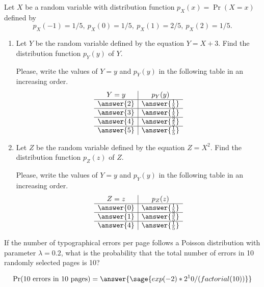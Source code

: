 \documentclass{ximera}
\begin{document}
\begin{problem}
Let $X$ be a random variable with distribution function $p_X(x)=\Pr(X=x)$ defined by
$$p_X(−1) = 1/5,~ p_X(0) = 1/5,~ p_X(1) = 2/5,~ p_X(2) = 1/5.$$

\medskip

\begin{enumerate}
    \item Let $Y$ be the random variable defined by the equation $Y = X + 3$. Find
the distribution function $p_Y (y)$ of $Y$.

\medskip

\begin{prompt}
    Please, write the values of $Y=y$ and $p_Y(y)$ in the following table in an increasing order.
    $$
    \begin{array}{c|c}
    Y=y & p_Y(y) \\
    \hline
    \answer{2} & \answer{\frac{1}{5}} \\
    \hline
    \answer{3} & \answer{\frac{1}{5}} \\
    \hline
    \answer{4} & \answer{\frac{2}{5}} \\
    \hline
    \answer{5} & \answer{\frac{1}{5}} \\
    \end{array}
    $$
\end{prompt}

    \item Let $Z$ be the random variable defined by the equation $Z = X^2$. Find the
distribution function $p_Z(z)$ of $Z$.

\medskip

\begin{prompt}
    Please, write the values of $Y=y$ and $p_Y(y)$ in the following table in an increasing order.
    $$
    \begin{array}{c|c}
    Z=z & p_Z(z) \\
    \hline
    \answer{0} & \answer{\frac{1}{5}} \\
    \hline
    \answer{1} & \answer{\frac{3}{5}} \\
    \hline
    \answer{4} & \answer{\frac{1}{5}} \\
    \end{array}
    $$

\end{prompt}
\end{enumerate}
\end{problem}

\begin{problem}

If the number of typographical errors per page follows a Poisson distribution with parameter $\lambda=0.2$, what is the probability that the total number of errors in 10 randomly selected pages is 10? 

\begin{prompt} %
$$\Pr(\text{10 errors in 10 pages})= \answer{\sage{exp(-2)*2^10/(factorial(10))}}$$
\end{prompt}
\end{problem}
\end{document}
